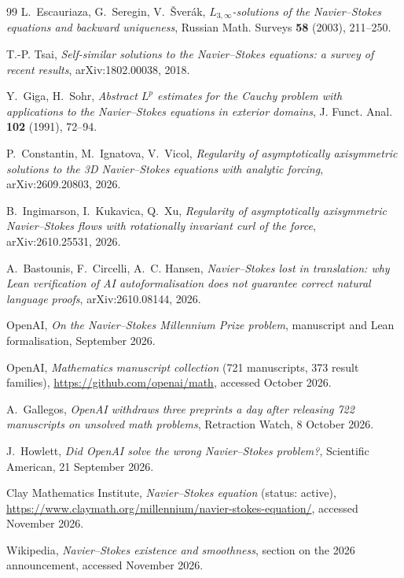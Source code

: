 \documentclass[11pt]{article}
\theoremstyle{remark}
\begin{document}
\begin{thebibliography}{99}
L.~Escauriaza, G.~Seregin, V.~\v{S}ver\'ak,
\emph{$L_{3,\infty}$-solutions of the Navier--Stokes equations and backward uniqueness},
Russian Math. Surveys \textbf{58} (2003), 211--250.

T.-P. Tsai,
\emph{Self-similar solutions to the Navier--Stokes equations: a survey of recent results},
arXiv:1802.00038, 2018.

Y.~Giga, H.~Sohr,
\emph{Abstract $L^p$ estimates for the Cauchy problem with applications to the Navier--Stokes
equations in exterior domains},
J. Funct. Anal. \textbf{102} (1991), 72--94.

P.~Constantin, M.~Ignatova, V.~Vicol,
\emph{Regularity of asymptotically axisymmetric solutions to the 3D Navier--Stokes equations
with analytic forcing}, arXiv:2609.20803, 2026.

B.~Ingimarson, I.~Kukavica, Q.~Xu,
\emph{Regularity of asymptotically axisymmetric Navier--Stokes flows with rotationally
invariant curl of the force}, arXiv:2610.25531, 2026.

A.~Bastounis, F.~Circelli, A.~C. Hansen,
\emph{Navier--Stokes lost in translation: why Lean verification of AI autoformalisation does
not guarantee correct natural language proofs}, arXiv:2610.08144, 2026.

OpenAI, \emph{On the Navier--Stokes Millennium Prize problem}, manuscript and Lean
formalisation, September 2026.

OpenAI, \emph{Mathematics manuscript collection} (721 manuscripts, 373 result families),
\url{https://github.com/openai/math}, accessed October 2026.

A.~Gallegos,
\emph{OpenAI withdraws three preprints a day after releasing 722 manuscripts on unsolved math
problems}, Retraction Watch, 8 October 2026.

J.~Howlett,
\emph{Did OpenAI solve the wrong Navier--Stokes problem?}, Scientific American, 21 September
2026.

Clay Mathematics Institute,
\emph{Navier--Stokes equation} (status: active),
\url{https://www.claymath.org/millennium/navier-stokes-equation/}, accessed November 2026.

Wikipedia, \emph{Navier--Stokes existence and smoothness}, section on the 2026 announcement,
accessed November 2026.

\end{thebibliography}
\end{document}
